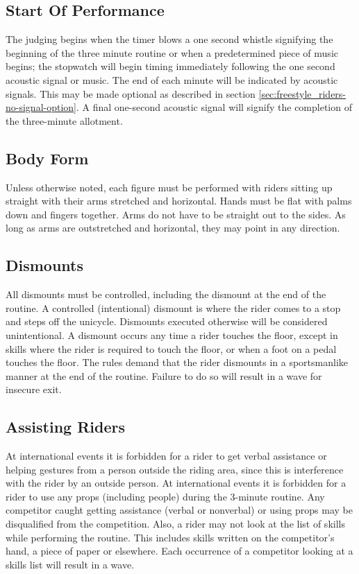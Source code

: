 \subsection{Start Of Performance}

The judging begins when the timer blows a one second whistle signifying the beginning of the three minute routine or when a predetermined piece of music begins; the stopwatch will begin timing immediately following the one second acoustic signal or music.
The end of each minute will be indicated by acoustic signals.
This may be made optional as described in section \ref{sec:freestyle_riders-no-signal-option}.
A final one-second acoustic signal will signify the completion of the three-minute allotment.

\subsection{Body Form}
Unless otherwise noted, each figure must be performed with riders sitting up straight with their arms stretched and horizontal.
Hands must be flat with palms down and fingers together.
Arms do not have to be straight out to the sides.
As long as arms are outstretched and horizontal, they may point in any direction.

\subsection{Dismounts}
All dismounts must be controlled, including the dismount at the end of the routine.
A controlled (intentional) dismount is where the rider comes to a stop and steps off the unicycle.
Dismounts executed otherwise will be considered unintentional.
A dismount occurs any time a rider touches the floor, except in skills where the rider is required to touch the floor, or when a foot on a pedal touches the floor.
The rules demand that the rider dismounts in a sportsmanlike manner at the end of the routine.
Failure to do so will result in a wave for insecure exit.

\subsection{Assisting Riders}
At international events it is forbidden for a rider to get verbal assistance or helping gestures from a person outside the riding area, since this is interference with the rider by an outside person.
At international events it is forbidden for a rider to use any props (including people) during the 3-minute routine.
Any competitor caught getting assistance (verbal or nonverbal) or using props may be disqualified from the competition.
Also, a rider may not look at the list of skills while performing the routine.
This includes skills written on the competitor's hand, a piece of paper or elsewhere.
Each occurrence of a competitor looking at a skills list will result in a wave.

